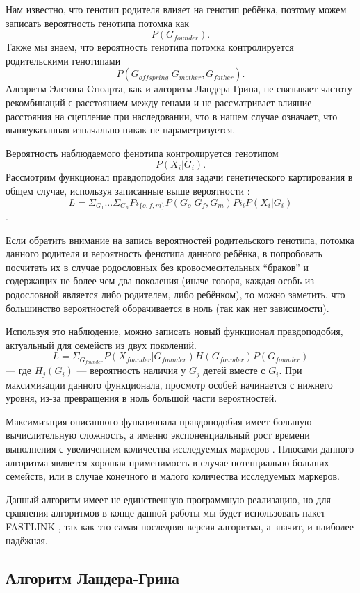 \documentclass{matmex-diploma-custom}
\begin{document}
Нам известно, что генотип родителя влияет на генотип ребёнка, поэтому
можем записать вероятность генотипа потомка как $$P(G_{founder}).$$
Также мы знаем, что вероятность генотипа потомка контролируется
родительскими генотипами $$P(G_{offspring} | G_{mother},
G_{father}).$$ Алгоритм Элстона-Стюарта, как и алгоритм Ландера-Грина,
не связывает частоту рекомбинаций с расстоянием между генами и не
рассматривает влияние расстояния на сцепление при наследовании, что в
нашем случае означает, что вышеуказанная изначально никак не
параметризуется.

Вероятность наблюдаемого фенотипа контролируется генотипом $$P(X_{i} |
G_{i}).$$ Рассмотрим функционал правдоподобия для задачи генетического
картирования в общем случае, используя записанные выше вероятности
\cite{elston1971general}: $$L =
\Sigma_{G_{1}}...\Sigma_{G_{n}}Pi_{\{o,f,m\}}P(G_{o} | G_{f}, G_{m})
Pi_{i}P(X_{i} | G_{i})$$.

Если обратить внимание на запись вероятностей родительского генотипа,
потомка данного родителя и вероятность фенотипа данного ребёнка, в
попробовать посчитать их в случае родословных без кровосмесительных
``браков'' и содержащих не более чем два поколения (иначе говоря,
каждая особь из родословной является либо родителем, либо ребёнком),
то можно заметить, что большинство вероятностей оборачивается в ноль
(так как нет зависимости).

Используя это наблюдение, можно записать новый функционал
правдоподобия, актуальный для семейств из двух поколений.$$L =
\Sigma_{G_{founder}}P(X_{founder}|G_{founder})H(G_{founder})P(G_{founder})$$
--- где $H_{j}(G_{i})$ --- вероятность наличия у $G_{j}$ детей вместе
с $G_{i}$. При максимизации данного функционала, просмотр особей
начинается с нижнего уровня, из-за превращения в ноль большой части
вероятностей.

Максимизация описанного функционала
правдоподобия имеет большую вычислительную сложность, а именно
экспоненциальный рост времени выполнения с увеличением количества
исследуемых маркеров \cite{fishelson2002exact}. Плюсами данного
алгоритма является хорошая применимость в случае потенциально больших
семейств, или в случае конечного и малого количества исследуемых
маркеров.

Данный алгоритм имеет не единственную программную реализацию, но для
сравнения алгоритмов в конце данной работы мы будет использовать пакет
FASTLINK \cite{faslinkUrl}, так как это самая последняя версия
алгоритма, а значит, и наиболее надёжная.

\subsection{Алгоритм Ландера-Грина}
\end{document}
